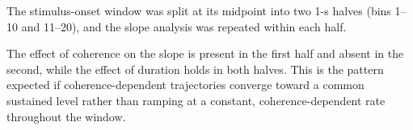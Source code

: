 \documentclass[a4paper,11pt]{article}
\theoremstyle{definition}
\newcommand{\1}{\mathbbm{1}}
\begin{document}
\bigskip

\label{tab:split}

The stimulus-onset window was split at its midpoint into two 1-s halves (bins 1--10 and 11--20), and the slope analysis was repeated within each half.

\begin{center}\small
{}
\end{center}
The effect of coherence on the slope is present in the first half and absent in the second, while the effect of duration holds in both halves. This is the pattern expected if coherence-dependent trajectories converge toward a common sustained level rather than ramping at a constant, coherence-dependent rate throughout the window.
\end{document}
